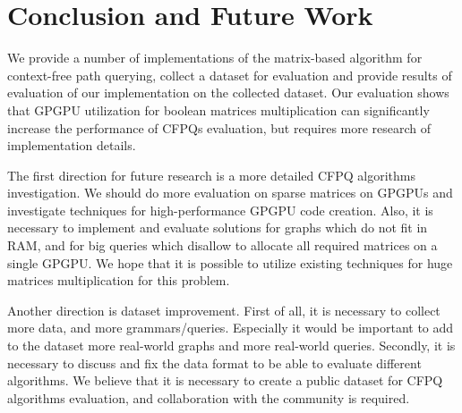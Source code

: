 \section{Conclusion and Future Work}

We provide a number of implementations of the matrix-based algorithm for context-free path querying, collect a dataset for evaluation and provide results of evaluation of our implementation on the collected dataset.
Our evaluation shows that GPGPU utilization for boolean matrices multiplication can significantly increase the performance of CFPQs evaluation, but requires more research of implementation details.

The first direction for future research is a more detailed CFPQ algorithms investigation.
We should do more evaluation on sparse matrices on GPGPUs and investigate techniques for high-performance GPGPU code creation.
Also, it is necessary to implement and evaluate solutions for graphs which do not fit in RAM, and for big queries which disallow to allocate all required matrices on a single GPGPU.
We hope that it is possible to utilize existing techniques for huge matrices multiplication for this problem.

Another direction is dataset improvement.
First of all, it is necessary to collect more data, and more grammars/queries.
Especially it would be important to add to the dataset more real-world graphs and more real-world queries.
Secondly, it is necessary to discuss and fix the data format to be able to evaluate different algorithms.
We believe that it is necessary to create a public dataset for CFPQ algorithms evaluation, and collaboration with the community is required.

